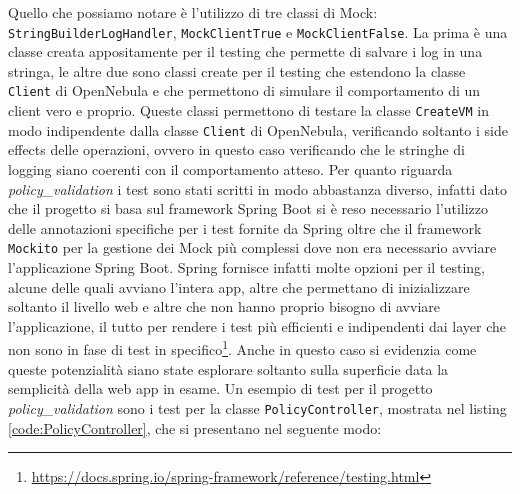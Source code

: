 Quello che possiamo notare è l'utilizzo di tre classi di Mock: \texttt{StringBuilderLogHandler}, \texttt{MockClientTrue} e \texttt{MockClientFalse}. La prima è una classe creata appositamente per il testing che permette di salvare i log in una stringa, le altre due sono classi create per il testing che estendono la classe \texttt{Client} di OpenNebula e che permettono di simulare il comportamento di un client vero e proprio. Queste classi permettono di testare la classe \texttt{CreateVM} in modo indipendente dalla classe \texttt{Client} di OpenNebula, verificando soltanto i side effects delle operazioni, ovvero in questo caso verificando che le stringhe di logging siano coerenti con il comportamento atteso.\medbreak
Per quanto riguarda \emph{policy\_validation} i test sono stati scritti in modo abbastanza diverso, infatti dato che il progetto si basa sul framework Spring Boot si è reso necessario l'utilizzo delle annotazioni specifiche per i test fornite da Spring oltre che il framework \texttt{Mockito}\cite{mockito} per la gestione dei Mock più complessi dove non era necessario avviare l'applicazione Spring Boot. Spring fornisce infatti molte opzioni per il testing, alcune delle quali avviano l'intera app, altre che permettano di inizializzare soltanto il livello web e altre che non hanno proprio bisogno di avviare l'applicazione, il tutto per rendere i test più efficienti e indipendenti dai layer che non sono in fase di test in specifico\footnote{\url{https://docs.spring.io/spring-framework/reference/testing.html}}. Anche in questo caso si evidenzia come queste potenzialità siano state esplorare soltanto sulla superficie data la semplicità della web app in esame.\medbreak
Un esempio di test per il progetto \emph{policy\_validation} sono i test per la classe \texttt{PolicyController}, mostrata nel listing \ref{code:PolicyController}, che si presentano nel seguente modo:
